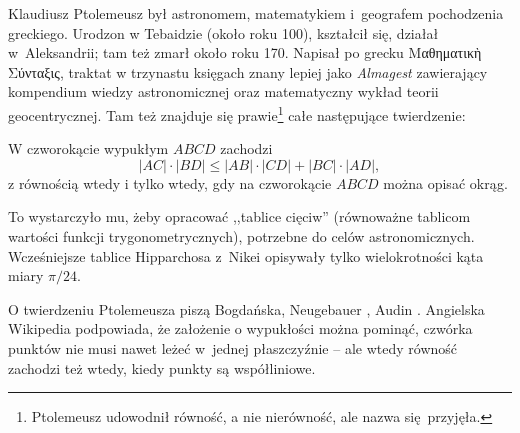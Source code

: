 
Klaudiusz Ptolemeusz był astronomem, matematykiem i~geografem pochodzenia greckiego.
%
Urodzon w Tebaidzie (około roku 100), kształcił się, działał w~Aleksandrii; tam też zmarł około roku 170.
Napisał po grecku Μαθηματικὴ Σύνταξις, traktat w trzynastu księgach znany lepiej jako \emph{Almagest} zawierający kompendium wiedzy astronomicznej oraz matematyczny wykład teorii geocentrycznej.
Tam też znajduje się prawie\footnote{Ptolemeusz udowodnił równość, a nie nierówność, ale nazwa się przyjęła.} całe następujące twierdzenie:



\begin{theorem}[Ptolemeusza, 140 r.n.e.]
%
%
    W czworokącie wypukłym $ABCD$ zachodzi
    \begin{equation}
        |AC| \cdot |BD| \le |AB| \cdot |CD| + |BC| \cdot |AD|,
    \end{equation}
    z równością wtedy i tylko wtedy, gdy na czworokącie $ABCD$ można opisać okrąg.
\end{theorem}

To wystarczyło mu, żeby opracować ,,tablice cięciw'' (równoważne tablicom wartości funkcji trygonometrycznych), potrzebne do celów astronomicznych.
Wcześniejsze tablice Hipparchosa z~Nikei opisywały tylko wielokrotności kąta miary $\pi/24$.

O twierdzeniu Ptolemeusza piszą Bogdańska, Neugebauer \cite[s. 62, 63]{neugebauer_2018}, Audin \cite[s. 108]{audin_2003}.
Angielska Wikipedia podpowiada, że założenie o wypukłości można pominąć, czwórka punktów nie musi nawet leżeć w~jednej płaszczyźnie -- ale wtedy równość zachodzi też wtedy, kiedy punkty są współliniowe.

